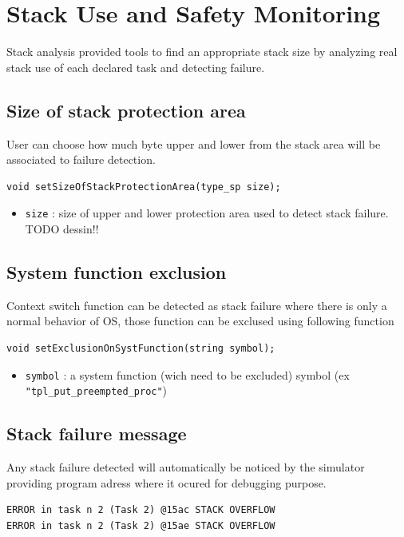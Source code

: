 \section{Stack Use and Safety Monitoring}
Stack analysis provided tools to find an appropriate stack size by analyzing real stack use of each declared task and detecting failure.

\subsection{Size of stack protection area}
User can choose how much byte upper and lower from the stack area will be associated to failure detection. 
\lstset{language=C++}
\begin{lstlisting}
void setSizeOfStackProtectionArea(type_sp size);
\end{lstlisting}
 \begin{itemize}
	\item  {\tt size} : size of upper and lower protection area used to detect stack failure. TODO dessin!!
\end{itemize}

\subsection{System function exclusion}
Context switch function can be detected as stack failure where there is only a normal behavior of OS, those function can be exclused using following function
\lstset{language=C++}
\begin{lstlisting}
void setExclusionOnSystFunction(string symbol);
\end{lstlisting}
 \begin{itemize}
	\item  {\tt symbol} :  a system function (wich need to be excluded) symbol  (ex  {\tt "tpl\_put\_preempted\_proc"})
\end{itemize}

\subsection{Stack failure message}
Any stack failure detected will automatically be noticed by the simulator providing program adress where it ocured for debugging purpose.

\begin{verbatim}
ERROR in task n 2 (Task 2) @15ac STACK OVERFLOW
ERROR in task n 2 (Task 2) @15ae STACK OVERFLOW
\end{verbatim}

